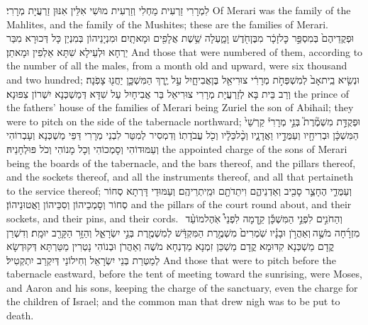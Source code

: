 {לִמְרָרִי זַרְעִית מַחְלִי וְזַרְעִית מוּשִׁי אִלֵּין אִנּוּן זַרְעֲיָת מְרָרִי׃}
{Of Merari was the family of the Mahlites, and the family of the Mushites; these are the families of Merari.}{}
{וּפְקֻדֵיהֶם֙ בְּמִסְפַּ֣ר כׇּל\maqqaf זָכָ֔ר מִבֶּן\maqqaf חֹ֖דֶשׁ וָמָ֑עְלָה שֵׁ֥שֶׁת אֲלָפִ֖ים וּמָאתָֽיִם׃}
{וּמִנְיָנֵיהוֹן בְּמִנְיַן כָּל דְּכוּרָא מִבַּר יַרְחָא וּלְעֵילָא שִׁתָּא אַלְפִין וּמָאתַן׃}
{And those that were numbered of them, according to the number of all the males, from a month old and upward, were six thousand and two hundred;}{}
{וּנְשִׂ֤יא בֵֽית\maqqaf אָב֙ לְמִשְׁפְּחֹ֣ת מְרָרִ֔י צוּרִיאֵ֖ל בֶּן\maqqaf אֲבִיחָ֑יִל עַ֣ל יֶ֧רֶךְ הַמִּשְׁכָּ֛ן יַחֲנ֖וּ צָפֹֽנָה׃}
{וְרַב בֵּית בָּא לְזַרְעֲיָת מְרָרִי צוּרִיאֵל בַּר אֲבִיחָיִל עַל שִׁדָּא דְּמַשְׁכְּנָא יִשְׁרוֹן צִפּוּנָא׃}
{the prince of the fathers’ house of the families of Merari being Zuriel the son of Abihail; they were to pitch on the side of the tabernacle northward;}{}
{וּפְקֻדַּ֣ת מִשְׁמֶ֘רֶת֮ בְּנֵ֣י מְרָרִי֒ קַרְשֵׁי֙ הַמִּשְׁכָּ֔ן וּבְרִיחָ֖יו וְעַמֻּדָ֣יו וַאֲדָנָ֑יו וְכׇ֨ל\maqqaf כֵּלָ֔יו וְכֹ֖ל עֲבֹדָתֽוֹ׃}
{וְדִמְסִיר לְמִטַּר לִבְנֵי מְרָרִי דַּפֵּי מַשְׁכְּנָא וְעָבְרוֹהִי וְעַמּוּדוֹהִי וְסָמְכוֹהִי וְכָל מָנוֹהִי וְכֹל פּוּלְחָנֵיהּ׃}
{the appointed charge of the sons of Merari being the boards of the tabernacle, and the bars thereof, and the pillars thereof, and the sockets thereof, and all the instruments thereof, and all that pertaineth to the service thereof;}{}
{וְעַמֻּדֵ֧י הֶחָצֵ֛ר סָבִ֖יב וְאַדְנֵיהֶ֑ם וִיתֵדֹתָ֖ם וּמֵֽיתְרֵיהֶֽם׃}
{וְעַמּוּדֵי דָּרְתָא סְחוֹר סְחוֹר וְסָמְכֵיהוֹן וְסִכֵּיהוֹן וַאֲטוּנֵיהוֹן׃}
{and the pillars of the court round about, and their sockets, and their pins, and their cords.}{}
{וְהַחֹנִ֣ים לִפְנֵ֣י הַמִּשְׁכָּ֡ן קֵ֣דְמָה לִפְנֵי֩ אֹֽהֶל\maqqaf מוֹעֵ֨ד \pasek  מִזְרָ֜חָה מֹשֶׁ֣ה \legarmeh  וְאַהֲרֹ֣ן וּבָנָ֗יו שֹֽׁמְרִים֙ מִשְׁמֶ֣רֶת הַמִּקְדָּ֔שׁ לְמִשְׁמֶ֖רֶת בְּנֵ֣י יִשְׂרָאֵ֑ל וְהַזָּ֥ר הַקָּרֵ֖ב יוּמָֽת׃}
{וְדִשְׁרַן קֳדָם מַשְׁכְּנָא קִדּוּמָא קֳדָם מַשְׁכַּן זִמְנָא מַדְנְחָא מֹשֶׁה וְאַהֲרֹן וּבְנוֹהִי נָטְרִין מַטַּרְתָּא דְּקוּדְשָׂא לְמַטְּרַת בְּנֵי יִשְׂרָאֵל וְחִילוֹנַי דְּיִקְרַב יִתְקְטִיל׃}
{And those that were to pitch before the tabernacle eastward, before the tent of meeting toward the sunrising, were Moses, and Aaron and his sons, keeping the charge of the sanctuary, even the charge for the children of Israel; and the common man that drew nigh was to be put to death.}{}
